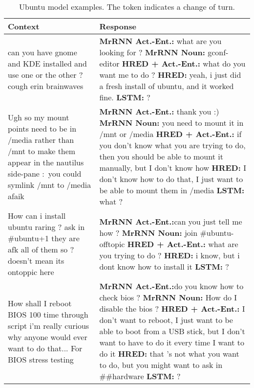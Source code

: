 \documentclass{article}
\begin{document}
\begin{table}[ht]
 \caption{Ubuntu model examples. The  token indicates a change of turn.}
 \label{table:ubuntu-examples-second}
 \scriptsize
 \centering
 \begin{tabular}{p{65mm}|p{60mm}}
 \textbf{Context} & \textbf{Response} \\ \hline
        can you have gnome and KDE installed and use one or the other ? cough erin brainwaves & \textbf{MrRNN Act.\@-Ent.:} what are you looking for ? \newline \textbf{MrRNN Noun:} gconf-editor \newline \textbf{HRED + Act.\@-Ent.\@:} what do you want me to do ? \newline \textbf{HRED:} yeah, i just did a fresh install of ubuntu, and it worked fine. \newline \textbf{LSTM:} ? \\ \hline 
        Ugh so my mount points need to be in /media rather than /mnt to make them appear in the nautilus side-pane :\  you could symlink /mnt to /media afaik & \textbf{MrRNN Act.\@ -Ent.\@:} thank you :) \newline \textbf{MrRNN Noun:} you need to mount it in /mnt or /media \newline \textbf{HRED + Act.\@-Ent.\@:} if you don't know what you are trying to do, then you should be able to mount it manually, but I don't know how \newline \textbf{HRED:} I don't know how to do that, I just want to be able to mount them in /media \newline \textbf{LSTM:} what ? \\ \hline 
        How can i install ubuntu raring ?  ask in \#ubuntu+1  they are afk all of them  so ? doesn't mean its ontoppic here & \textbf{MrRNN Act.\@ -Ent.\@:}can you just tell me how ? \newline \textbf{MrRNN Noun:} join \#ubuntu-offtopic \newline \textbf{HRED + Act.\@-Ent.\@:} what are you trying to do ? \newline \textbf{HRED:} i know, but i dont know how to install it \newline \textbf{LSTM:} ? \\ \hline 
        How shall I reboot BIOS 100 time through script  i'm really curious why anyone would ever want to do that...  For BIOS stress testing & \textbf{MrRNN Act.\@ -Ent.\@:}do you know how to check bios ? \newline \textbf{MrRNN Noun:} How do I disable the bios ? \newline \newline \textbf{HRED + Act.\@-Ent.\@:} I don't want to reboot, I just want to be able to boot from a USB stick, but I don't want to have to do it every time I want to do it \newline \textbf{HRED:} that 's not what you want to do, but you might want to ask in \#\#hardware \newline \textbf{LSTM:} ? \\ \hline 

\end{tabular}
\end{table}
\end{document}
